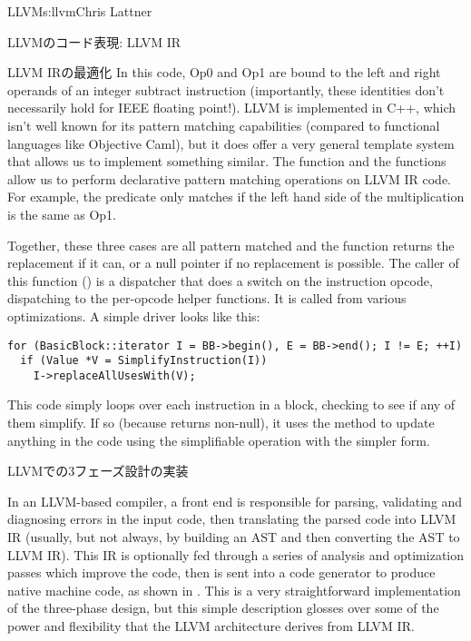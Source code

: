 \begin{aosachapter}{LLVM}{s:llvm}{Chris Lattner}
\begin{aosasect1}{LLVMのコード表現: LLVM IR}
\begin{aosasect2}{LLVM IRの最適化}
\noindent In this code, Op0 and Op1 are bound to the left and right operands of
an integer subtract instruction (importantly, these identities don't
necessarily hold for IEEE floating point!).  LLVM is implemented in
C++, which isn't well known for its pattern matching capabilities
(compared to functional languages like Objective Caml), but it does
offer a very general template system that allows us to implement
something similar.  The  function and the 
functions allow us to perform declarative pattern matching operations
on LLVM IR code.  For example, the  predicate only
matches if the left hand side of the multiplication is the same as Op1.

Together, these three cases are all pattern matched and the function
returns the replacement if it can, or a null pointer if no replacement
is possible.  The caller of this function ()
is a dispatcher that does a switch on the instruction opcode,
dispatching to the per-opcode helper functions.  It is called from
various optimizations. A simple driver looks like this:

\begin{verbatim}
for (BasicBlock::iterator I = BB->begin(), E = BB->end(); I != E; ++I)
  if (Value *V = SimplifyInstruction(I))
    I->replaceAllUsesWith(V);
\end{verbatim}

\noindent This code simply loops over each instruction in a block, checking to
see if any of them simplify.  If so (because
 returns non-null), it uses the
 method to update anything in the code using
the simplifiable operation with the simpler form.

\end{aosasect2}

\end{aosasect1}

\begin{aosasect1}{LLVMでの3フェーズ設計の実装}

In an LLVM-based compiler, a front end is responsible for parsing,
validating and diagnosing errors in the input code, then translating
the parsed code into LLVM IR (usually, but not always, by building an
AST and then converting the AST to LLVM IR).  This IR is optionally
fed through a series of analysis and optimization passes which improve
the code, then is sent into a code generator to produce native machine
code, as shown in . This is a very
straightforward implementation of the three-phase design, but this
simple description glosses over some of the power and flexibility
that the LLVM architecture derives from LLVM IR.


\end{aosasect1}
\end{aosachapter}
